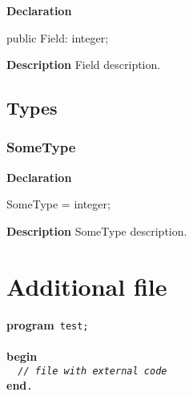 \documentclass{report}
\begin{document}
\begin{list}{}{
\setlength{\itemindent}{0cm}
\setlength{\listparindent}{0cm}
\setlength{\leftmargin}{\evensidemargin}
\addtolength{\leftmargin}{\tmplength}
\settowidth{\labelsep}{X}
\addtolength{\leftmargin}{\labelsep}
\setlength{\labelwidth}{\tmplength}
}
\begin{flushleft}
\item[\textbf{Declaration}\hfill]
\begin{ttfamily}
public Field: integer;\end{ttfamily}


\end{flushleft}
\par
\item[\textbf{Description}]
Field description.

\end{list}
\section{Types}
\subsection*{SomeType}
\begin{list}{}{
\setlength{\itemindent}{0cm}
\setlength{\listparindent}{0cm}
\setlength{\leftmargin}{\evensidemargin}
\addtolength{\leftmargin}{\tmplength}
\settowidth{\labelsep}{X}
\addtolength{\leftmargin}{\labelsep}
\setlength{\labelwidth}{\tmplength}
}
\begin{flushleft}
\item[\textbf{Declaration}\hfill]
\begin{ttfamily}
SomeType = integer;\end{ttfamily}


\end{flushleft}
\par
\item[\textbf{Description}]
SomeType description.

\end{list}
\chapter{Additional file}
 

\texttt{}\textbf{program}\texttt{~test;\\\nopagebreak[3]
\\\nopagebreak[3]
}\textbf{begin}\texttt{\\\nopagebreak[3]
~~\textit{//~file~with~external~code}\\\nopagebreak[3]
}\textbf{end}\texttt{.\\
}
\end{document}
